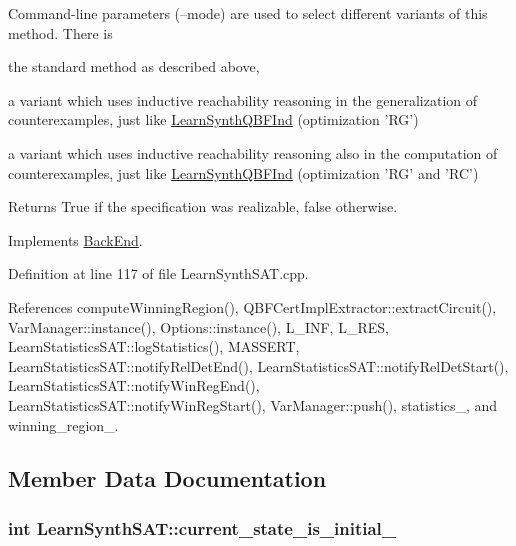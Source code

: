 Command-\/line parameters (--mode) are used to select different variants of this method. There is 
\begin{DoxyItemize}
\item the standard method as described above, 
\item a variant which uses inductive reachability reasoning in the generalization of counterexamples, just like \hyperlink{classLearnSynthQBFInd}{Learn\-Synth\-Q\-B\-F\-Ind} (optimization 'R\-G') 
\item a variant which uses inductive reachability reasoning also in the computation of counterexamples, just like \hyperlink{classLearnSynthQBFInd}{Learn\-Synth\-Q\-B\-F\-Ind} (optimization 'R\-G' and 'R\-C') 
\end{DoxyItemize}

\begin{DoxyReturn}{Returns}
True if the specification was realizable, false otherwise. 
\end{DoxyReturn}


Implements \hyperlink{classBackEnd_a099e717dc71e9cc2d838b1ca86340590}{Back\-End}.



Definition at line 117 of file Learn\-Synth\-S\-A\-T.\-cpp.



References compute\-Winning\-Region(), Q\-B\-F\-Cert\-Impl\-Extractor\-::extract\-Circuit(), Var\-Manager\-::instance(), Options\-::instance(), L\-\_\-\-I\-N\-F, L\-\_\-\-R\-E\-S, Learn\-Statistics\-S\-A\-T\-::log\-Statistics(), M\-A\-S\-S\-E\-R\-T, Learn\-Statistics\-S\-A\-T\-::notify\-Rel\-Det\-End(), Learn\-Statistics\-S\-A\-T\-::notify\-Rel\-Det\-Start(), Learn\-Statistics\-S\-A\-T\-::notify\-Win\-Reg\-End(), Learn\-Statistics\-S\-A\-T\-::notify\-Win\-Reg\-Start(), Var\-Manager\-::push(), statistics\-\_\-, and winning\-\_\-region\-\_\-.



\subsection{Member Data Documentation}
\hypertarget{classLearnSynthSAT_ace0511849ad0020364743f54dd75afee}{
\subsubsection[{current\-\_\-state\-\_\-is\-\_\-initial\-\_\-}]{\setlength{\rightskip}{0pt plus 5cm}int Learn\-Synth\-S\-A\-T\-::current\-\_\-state\-\_\-is\-\_\-initial\-\_\-\hspace{0.3cm}{\ttfamily [protected]}}}\label{classLearnSynthSAT_ace0511849ad0020364743f54dd75afee}


